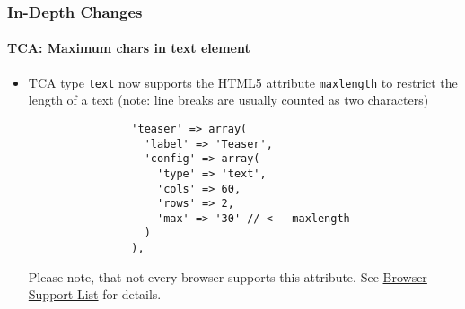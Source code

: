 %

\begin{frame}[fragile]
	\frametitle{In-Depth Changes}
	\framesubtitle{TCA: Maximum chars in text element}

	\begin{itemize}
		\item TCA type \texttt{text} now supports the HTML5 attribute \texttt{maxlength}
			to restrict the length of a text (note: line breaks are usually counted as two
			characters)

			\begin{lstlisting}
				'teaser' => array(
				  'label' => 'Teaser',
				  'config' => array(
				    'type' => 'text',
				    'cols' => 60,
				    'rows' => 2,
				    'max' => '30' // <-- maxlength
				  )
				),
			\end{lstlisting}

			Please note, that not every browser supports this attribute.\newline
			See \href{http://www.w3schools.com/tags/att_textarea_maxlength.asp}{Browser Support List} for details.

	\end{itemize}

\end{frame}


